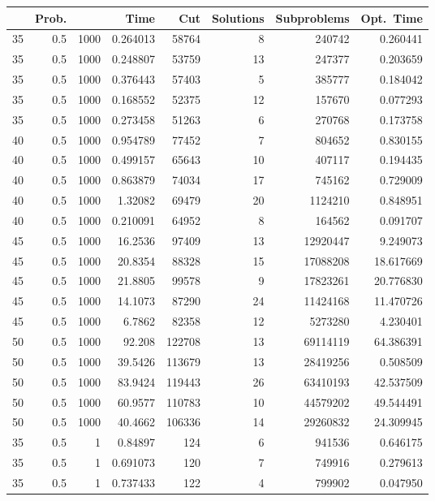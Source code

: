 \documentclass[a4paper,11pt]{article}
\begin{document}
\begin{table}
\begin{center}
\begin{tabular}{|rrr|r|r|rr|r|}
\hline
 & Prob. &  & Time & Cut & Solutions & Subproblems & Opt.\ Time \\
\hline
35 & 0.5 & 1000 & 0.264013 & 58764 & 8 & 240742 & 0.260441 \\
35 & 0.5 & 1000 & 0.248807 & 53759 & 13 & 247377 & 0.203659 \\
35 & 0.5 & 1000 & 0.376443 & 57403 & 5 & 385777 & 0.184042 \\
35 & 0.5 & 1000 & 0.168552 & 52375 & 12 & 157670 & 0.077293 \\
35 & 0.5 & 1000 & 0.273458 & 51263 & 6 & 270768 & 0.173758 \\
40 & 0.5 & 1000 & 0.954789 & 77452 & 7 & 804652 & 0.830155 \\
40 & 0.5 & 1000 & 0.499157 & 65643 & 10 & 407117 & 0.194435 \\
40 & 0.5 & 1000 & 0.863879 & 74034 & 17 & 745162 & 0.729009 \\
40 & 0.5 & 1000 & 1.32082 & 69479 & 20 & 1124210 & 0.848951 \\
40 & 0.5 & 1000 & 0.210091 & 64952 & 8 & 164562 & 0.091707 \\
45 & 0.5 & 1000 & 16.2536 & 97409 & 13 & 12920447 & 9.249073 \\
45 & 0.5 & 1000 & 20.8354 & 88328 & 15 & 17088208 & 18.617669 \\
45 & 0.5 & 1000 & 21.8805 & 99578 & 9 & 17823261 & 20.776830 \\
45 & 0.5 & 1000 & 14.1073 & 87290 & 24 & 11424168 & 11.470726 \\
45 & 0.5 & 1000 & 6.7862 & 82358 & 12 & 5273280 & 4.230401 \\
50 & 0.5 & 1000 & 92.208 & 122708 & 13 & 69114119 & 64.386391 \\
50 & 0.5 & 1000 & 39.5426 & 113679 & 13 & 28419256 & 0.508509 \\
50 & 0.5 & 1000 & 83.9424 & 119443 & 26 & 63410193 & 42.537509 \\
50 & 0.5 & 1000 & 60.9577 & 110783 & 10 & 44579202 & 49.544491 \\
50 & 0.5 & 1000 & 40.4662 & 106336 & 14 & 29260832 & 24.309945 \\
\hline
35 & 0.5 & 1 & 0.84897 & 124 & 6 & 941536 & 0.646175 \\
35 & 0.5 & 1 & 0.691073 & 120 & 7 & 749916 & 0.279613 \\
35 & 0.5 & 1 & 0.737433 & 122 & 4 & 799902 & 0.047950 \\

\end{tabular}
\end{center}
\end{table}
\end{document}
